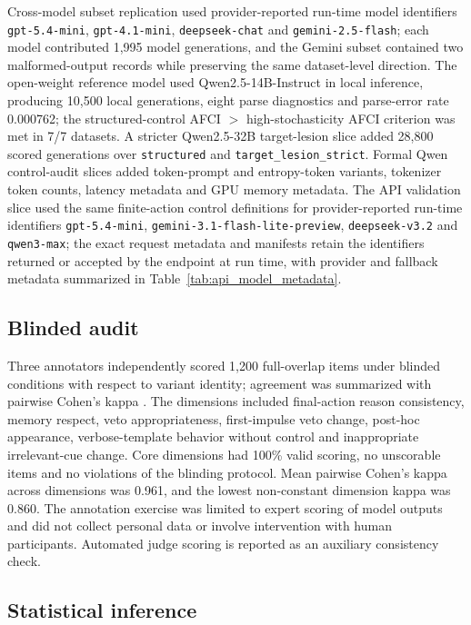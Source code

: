 ﻿\documentclass[preprint,12pt,authoryear]{elsarticle}
\begin{document}
Cross-model subset replication used provider-reported run-time model identifiers \texttt{gpt-5.4-mini}, \texttt{gpt-4.1-mini}, \texttt{deepseek-chat} and \texttt{gemini-2.5-flash}; each model contributed 1,995 model generations, and the Gemini subset contained two malformed-output records while preserving the same dataset-level direction. The open-weight reference model used Qwen2.5-14B-Instruct in local inference, producing 10,500 local generations, eight parse diagnostics and parse-error rate 0.000762; the structured-control AFCI \(>\) high-stochasticity AFCI criterion was met in 7/7 datasets. A stricter Qwen2.5-32B target-lesion slice added 28,800 scored generations over \texttt{structured} and \texttt{target\_lesion\_strict}. Formal Qwen control-audit slices added token-prompt and entropy-token variants, tokenizer token counts, latency metadata and GPU memory metadata. The API validation slice used the same finite-action control definitions for provider-reported run-time identifiers \texttt{gpt-5.4-mini}, \texttt{gemini-3.1-flash-lite-preview}, \texttt{deepseek-v3.2} and \texttt{qwen3-max}; the exact request metadata and manifests retain the identifiers returned or accepted by the endpoint at run time, with provider and fallback metadata summarized in Table~\ref{tab:api_model_metadata}.

\subsection{Blinded audit}

Three annotators independently scored 1,200 full-overlap items under blinded conditions with respect to variant identity; agreement was summarized with pairwise Cohen's kappa \citep{cohen1960coefficient}. The dimensions included final-action reason consistency, memory respect, veto appropriateness, first-impulse veto change, post-hoc appearance, verbose-template behavior without control and inappropriate irrelevant-cue change. Core dimensions had 100\% valid scoring, no unscorable items and no violations of the blinding protocol. Mean pairwise Cohen's kappa across dimensions was 0.961, and the lowest non-constant dimension kappa was 0.860. The annotation exercise was limited to expert scoring of model outputs and did not collect personal data or involve intervention with human participants. Automated judge scoring is reported as an auxiliary consistency check.

\subsection{Statistical inference}
\end{document}
